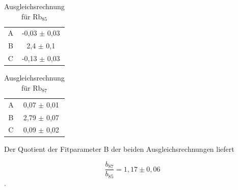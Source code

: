\begin{table}[h!]
\centering
\begin{tabular}{cc} \toprule
\centering
A & -0,03 $\pm$ 0,03 \\
B & 2,4 $\pm$ 0,1 \\
C & -0,13 $\pm$ 0,03 \\
\bottomrule
\end{tabular}
\label{x}
\caption{Ausgleichsrechnung für $\text{Rb}_{85}$}
\end{table}

\begin{table}[h!]
\centering
\begin{tabular}{cc} \toprule
\centering
A & 0,07 $\pm$ 0,01 \\
B & 2,79 $\pm$ 0,07 \\
C & 0,09 $\pm$ 0,02 \\
\bottomrule
\end{tabular}
\label{y}
\caption{Ausgleichsrechnung für $\text{Rb}_{87}$}
\end{table}

Der Quotient der Fitparameter B der beiden Ausgleichsrechnungen liefert

\begin{equation}
\frac{b_{87}}{b_{85}} = 1,17 \pm 0,06
\end{equation}
.
